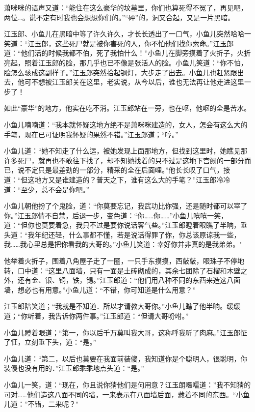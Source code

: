 \documentclass[12pt,oneside]{book}
\begin{document}
萧咪咪的语声又道：``能住在这么豪华的坟墓里，你们也算死得不冤了，再见吧，两位\ldots。说不定有时我也会想想你们的。''``砰''的，洞又合起，又是一片黑暗。

江玉郎、小鱼儿在黑暗中等了许久许久，才长长透出了一口气，小鱼儿突然哈哈一笑道：``江玉郎，这些死尸就是被你害死的人，你不怕他们找你索命。''江玉郎道：``他们活的时候我都不伯，死了我怕什么！''小鱼儿在脚旁摸着了火折子，火折亮起，照着江玉郎的脸，那几乎也已不像是张活人的脸。小鱼儿笑道：``你不怕，脸怎么骇成这副样子。''江玉郎突然拾起钢灯，大步走了出去。小鱼儿也赶紧跟出去，他可不想被江玉郎关在这里，老实说，从今以后，谁也无法再让他走进这里一步了！

如此``豪华''的地方，他实在吃不消。江玉郎站在一旁，也在呕，他呕的全是苦水。

小鱼儿喃喃道：``我本就怀疑这地方绝不是萧咪咪建造的，女人，怎会有这么大的手笔，现在已可证明我怀疑的果然不错。''江玉郎道；``哼。''

小鱼儿道：``她不知走了什么运，被她发现上面那地方，但找到这里时，她瞧见那许多死尸，就再也不敢往下找了，却不知她找着的只不过是这地下宫阙的一部分而已，说不定只是最差劲的一部分，精采的全在后面哩。''他长长叹了口气，接道：``但这地方又是谁建造的？普天之下，谁有这么大的手笔？''江玉郎冷冷道：``至少，总不会是你吧。''

小鱼儿朝他扮了个鬼脸，道：``你莫要忘记，我武功比你强，还是随时都可以宰了你。''江玉郎情不自禁，后退一步，变色道：``你\ldots\ldots 你\ldots\ldots{}''小鱼儿嘻嘻一笑，道：``但你也莫要着急，我只不过是要你说话客气些。''江玉郎瞪着眼瞧了半晌，垂头道：``我年纪还轻，什么事都不懂，若是说话得罪了你，你总该原谅我一些，我\ldots\ldots 我心里总是把你看我的大哥的。''小鱼儿笑道：幸好你并非真的是我弟弟。"

他举着火折子，围着八角屋子走了一圈，一只手东摸摸，西敲敲，眼珠子不停地转，口中道：``这里八面墙，只有一面是土砖砌成的，其余七团除了石榴和木壁之外，还有金、银、铜，铁，锡。''江玉郎道：``他们用八种不同的东西来造这八面墙，想必也有用意。''小鱼儿道：``不错，你可知道是什么用意？''

江玉郎陪笑道；``我就是不知道．所以才请教大哥你。''小鱼儿瞧了他半晌。缓缓道；``你听着，我告诉你两件事。''江玉郎道：``但请大哥吩咐。''

小鱼儿瞪着眼道；``第一，你以后千万莫叫我大哥，这称呼我听了肉麻。''江玉郎怔了怔，立刻垂下头，道：``是。''

小鱼儿道：``第二，以后也莫要在我面前装傻，我知道你是个聪明人，很聪明，你装傻也没有用的．''江玉郎乖乖地点头道：``是。''

小鱼儿一笑，道：``现在，你且说你猜他们是何用意？江玉朗嗫嚅道：''我不知猜的可对\ldots\ldots 他们造这八面不同的墙，一来表示在八面墙后面，藏着不同的东西。``小鱼儿道：''不错，二来呢？"
\end{document}
